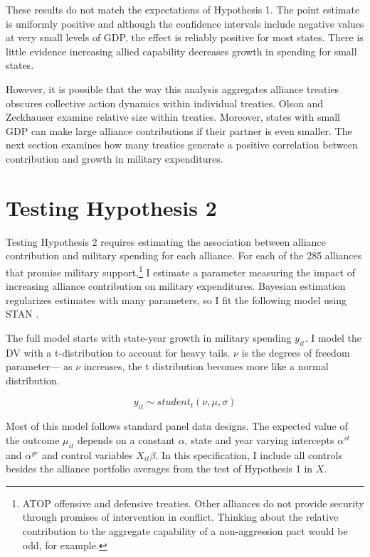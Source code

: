 \documentclass[12pt]{article}
\begin{document}
These results do not match the expectations of Hypothesis 1. 
The point estimate is uniformly positive and although the confidence intervals include negative values at very small levels of GDP, the effect is reliably positive for most states. 
There is little evidence increasing allied capability decreases growth in spending for small states. 


However, it is possible that the way this analysis aggregates alliance treaties obscures collective action dynamics within individual treaties. 
Olson and Zeckhauser examine relative size within treaties. 
Moreover, states with small GDP can make large alliance contributions if their partner is even smaller. 
The next section examines how many treaties generate a positive correlation between contribution and growth in military expenditures. 


\section{Testing Hypothesis 2}


Testing Hypothesis 2 requires estimating the association between alliance contribution and military spending for each alliance.
For each of the 285 alliances that promise military support,\footnote{ATOP offensive and defensive treaties. Other alliances do not provide security through promises of intervention in conflict. Thinking about the relative contribution to the aggregate capability of a non-aggression pact would be odd, for example.} I estimate a parameter measuring the impact of increasing alliance contribution on military expenditures. 
Bayesian estimation regularizes estimates with many parameters, so I fit the following model using STAN \citep{Carpenteretal2016}.


The full model starts with state-year growth in military spending $y_{it}$.
I model the DV with a t-distribution to account for heavy tails.
$\nu$ is the degrees of freedom parameter--- as $\nu$ increases, the t distribution becomes more like a normal distribution. 


\begin{equation}
y_{it} \sim student_t(\nu, \mu, \sigma) 
\end{equation}


Most of this model follows standard panel data designs.
The expected value of the outcome $\mu_{it}$ depends on a constant $\alpha$, state and year varying intercepts $\alpha^{st}$ and $\alpha^{yr}$ and control variables $X_{it} \beta$. 
In this specification, I include all controls besides the alliance portfolio averages from the test of Hypothesis 1 in $X$.
\end{document}
